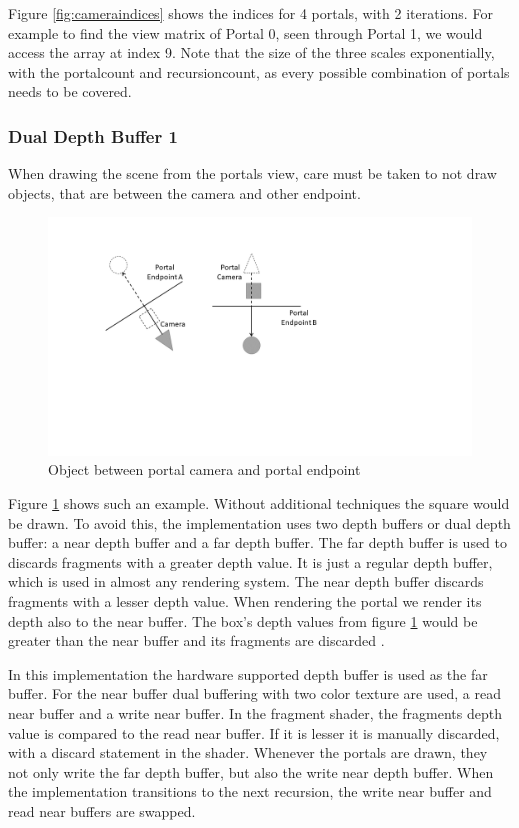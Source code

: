 Figure \ref{fig:cameraindices} shows the indices for 4 portals, with 2 iterations. For example to find the view matrix of Portal 0, seen through Portal 1, we would access the array at index 9. Note that the size of the three scales exponentially, with the \gls{portalcount} and \gls{recursioncount}, as every possible combination of portals needs to be covered. 


\subsubsection{Dual Depth Buffer 1}

When drawing the scene from the portals view, care must be taken to not draw objects, that are between the camera and other endpoint.
\begin{figure}[h]
	\includegraphics[width=\linewidth]{images/bananajuce.png}
	\caption{Object between portal camera and portal endpoint}
	\label{fig:bananajuce}
\end{figure}

Figure \ref{fig:bananajuce} shows such an example. Without additional techniques the square would be drawn. To avoid this, the implementation uses two depth buffers or dual depth buffer: a near depth buffer and a far depth buffer. The far depth buffer is used to discards fragments with a greater depth value. It is just a regular depth buffer, which is used in almost any rendering system. The near depth buffer discards fragments with a lesser depth value. When rendering the portal we render its depth also to the near buffer. The box's depth values from figure \ref{fig:bananajuce} would be greater than the near buffer and its fragments are discarded \cite{lowe:2005:technique}.

In this implementation the hardware supported depth buffer is used as the far buffer. For the near buffer dual buffering with two color texture are used, a read near buffer and a write near buffer. In the fragment shader, the fragments depth value is compared to the read near buffer. If it is lesser it is manually discarded, with a discard statement in the shader. Whenever the portals are drawn, they not only write the far depth buffer, but also the write near depth buffer. When the implementation transitions to the next recursion, the write near buffer and read near buffers are swapped.

